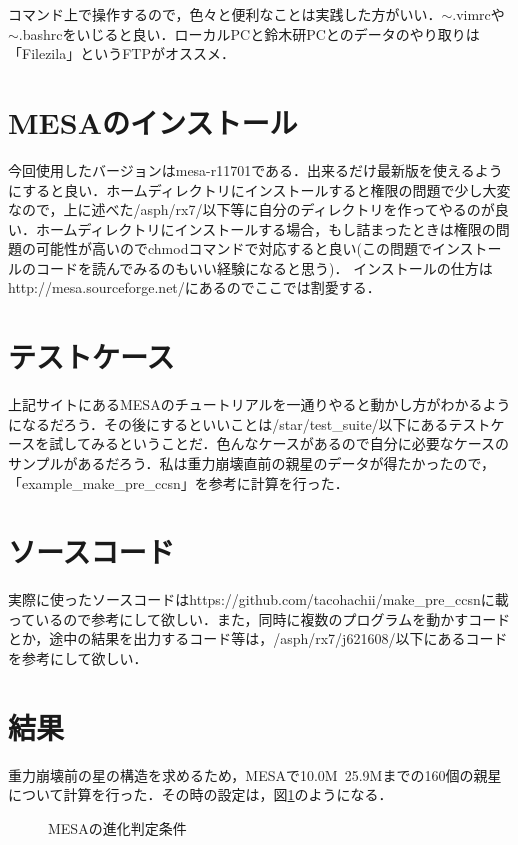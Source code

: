 コマンド上で操作するので，色々と便利なことは実践した方がいい．$\sim$.vimrcや$\sim$.bashrcをいじると良い．ローカルPCと鈴木研PCとのデータのやり取りは「Filezila」というFTPがオススメ．

\section{MESAのインストール}

今回使用したバージョンはmesa-r11701である．出来るだけ最新版を使えるようにすると良い．ホームディレクトリにインストールすると権限の問題で少し大変なので，上に述べた/asph/rx7/以下等に自分のディレクトリを作ってやるのが良い．ホームディレクトリにインストールする場合，もし詰まったときは権限の問題の可能性が高いのでchmodコマンドで対応すると良い(この問題でインストールのコードを読んでみるのもいい経験になると思う)．
インストールの仕方はhttp://mesa.sourceforge.net/\cite{mesa}にあるのでここでは割愛する．

\section{テストケース}

上記サイト\cite{mesa}にあるMESAのチュートリアルを一通りやると動かし方がわかるようになるだろう．その後にするといいことは/star/test\_suite/以下にあるテストケースを試してみるということだ．色んなケースがあるので自分に必要なケースのサンプルがあるだろう．私は重力崩壊直前の親星のデータが得たかったので，「example\_make\_pre\_ccsn」を参考に計算を行った．

\section{ソースコード}

実際に使ったソースコードはhttps://github.com/tacohachii/make\_pre\_ccsnに載っているので参考にして欲しい．また，同時に複数のプログラムを動かすコードとか，途中の結果を出力するコード等は，/asph/rx7/j621608/以下にあるコードを参考にして欲しい．

\section{結果}

重力崩壊前の星の構造を求めるため，MESAで10.0M~25.9Mまでの160個の親星について計算を行った．その時の設定は，図\ref{fig:mesa_setting}のようになる．

\begin{figure}[htbp]
  \begin{center}
  \end{center}
  \caption{MESAの進化判定条件}
  \label{fig:mesa_setting}
\end{figure}

